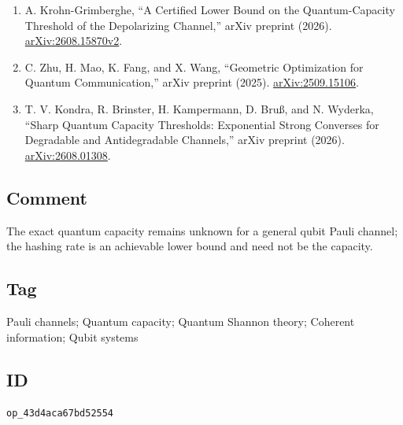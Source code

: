 \begin{enumerate}[label={},leftmargin=4.8em,labelsep=0.5em]
  \item[\textup{[KG26]}]\label{ref:p1-krohn-grimberghe}
  A. Krohn-Grimberghe,
  ``A Certified Lower Bound on the Quantum-Capacity Threshold of the
  Depolarizing Channel,'' arXiv preprint (2026).
  \href{https://arxiv.org/abs/2608.15870}{arXiv:2608.15870v2}.

  \item[\textup{[ZMFW25]}]\label{ref:p1-zhu-mao-fang-wang}
  C. Zhu, H. Mao, K. Fang, and X. Wang,
  ``Geometric Optimization for Quantum Communication,'' arXiv preprint
  (2025).
  \href{https://arxiv.org/abs/2509.15106v1}{arXiv:2509.15106}.

  \item[\textup{[KBK+26]}]\label{ref:p1-kondra-et-al}
  T. V. Kondra, R. Brinster, H. Kampermann, D. Bru{\ss}, and N. Wyderka,
  ``Sharp Quantum Capacity Thresholds: Exponential Strong Converses for
  Degradable and Antidegradable Channels,'' arXiv preprint (2026).
  \href{https://arxiv.org/abs/2608.01308}{arXiv:2608.01308}.
\end{enumerate}

\subsection*{Comment}

The exact quantum capacity remains unknown for a general qubit Pauli channel;
the hashing rate is an achievable lower bound and need not be the capacity.

\subsection*{Tag}

Pauli channels; Quantum capacity; Quantum Shannon theory; Coherent information;
Qubit systems

\subsection*{ID}

\texttt{op\_43d4aca67bd52554}
